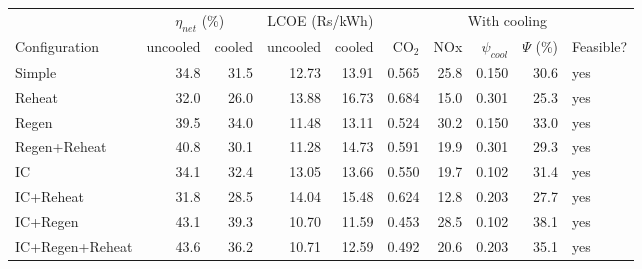 \begin{tabular}{lrrrrrrrrl}\toprule
 & \multicolumn{2}{c}{$\eta_{net}$ (\%)} & \multicolumn{2}{c}{LCOE (Rs/kWh)} & \multicolumn{5}{c}{With cooling}\\
\cmidrule(lr){2-3}\cmidrule(lr){4-5}\cmidrule(lr){6-10}
Configuration & uncooled & cooled & uncooled & cooled & CO$_2$ & NOx & $\psi_{cool}$ & $\Psi$ (\%) & Feasible?\\\midrule
Simple & 34.8 & 31.5 & 12.73 & 13.91 & 0.565 & 25.8 & 0.150 & 30.6 & yes\\
Reheat & 32.0 & 26.0 & 13.88 & 16.73 & 0.684 & 15.0 & 0.301 & 25.3 & yes\\
Regen & 39.5 & 34.0 & 11.48 & 13.11 & 0.524 & 30.2 & 0.150 & 33.0 & yes\\
Regen+Reheat & 40.8 & 30.1 & 11.28 & 14.73 & 0.591 & 19.9 & 0.301 & 29.3 & yes\\
IC & 34.1 & 32.4 & 13.05 & 13.66 & 0.550 & 19.7 & 0.102 & 31.4 & yes\\
IC+Reheat & 31.8 & 28.5 & 14.04 & 15.48 & 0.624 & 12.8 & 0.203 & 27.7 & yes\\
IC+Regen & 43.1 & 39.3 & 10.70 & 11.59 & 0.453 & 28.5 & 0.102 & 38.1 & yes\\
IC+Regen+Reheat & 43.6 & 36.2 & 10.71 & 12.59 & 0.492 & 20.6 & 0.203 & 35.1 & yes\\
\bottomrule\end{tabular}